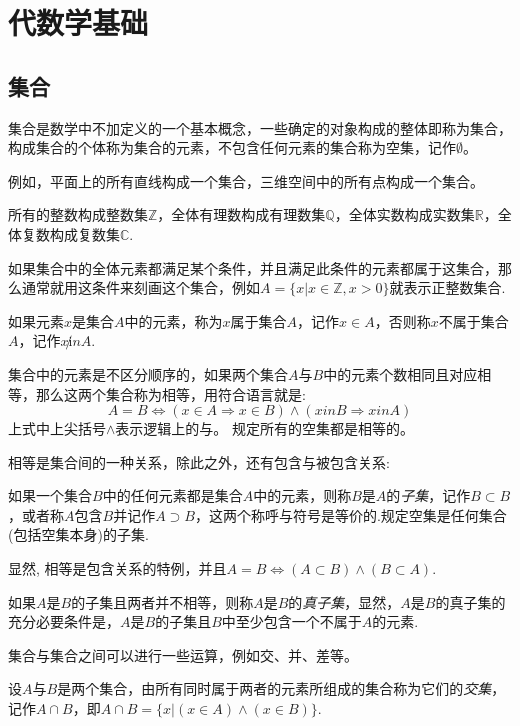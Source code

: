 
\section{代数学基础}
\label{sec:algebra-base}

\subsection{集合}
\label{sec:set}

集合是数学中不加定义的一个基本概念，一些确定的对象构成的整体即称为集合，构成集合的个体称为集合的元素，不包含任何元素的集合称为空集，记作$\emptyset$。

例如，平面上的所有直线构成一个集合，三维空间中的所有点构成一个集合。

所有的整数构成整数集$\mathbb{Z}$，全体有理数构成有理数集$\mathbb{Q}$，全体实数构成实数集$\mathbb{R}$，全体复数构成复数集$\mathbb{C}$.

如果集合中的全体元素都满足某个条件，并且满足此条件的元素都属于这集合，那么通常就用这条件来刻画这个集合，例如$A=\{ x | x \in \mathbb{Z}, x>0 \}$就表示正整数集合.

如果元素$x$是集合$A$中的元素，称为$x$属于集合$A$，记作$x \in A$，否则称$x$不属于集合$A$，记作$x \not in A$.

集合中的元素是不区分顺序的，如果两个集合$A$与$B$中的元素个数相同且对应相等，那么这两个集合称为相等，用符合语言就是:
\[ A = B \Leftrightarrow (x \in A \Rightarrow x \in B) \wedge (x in B \Rightarrow x in A) \]
上式中上尖括号$\wedge$表示逻辑上的与。
 规定所有的空集都是相等的。 

 相等是集合间的一种关系，除此之外，还有包含与被包含关系:
 \begin{definition}
   如果一个集合$B$中的任何元素都是集合$A$中的元素，则称$B$是$A$的\emph{子集}，记作$B \subset B$，或者称$A$包含$B$并记作$A \supset B$，这两个称呼与符号是等价的.规定空集是任何集合(包括空集本身)的子集.
 \end{definition}

 显然, 相等是包含关系的特例，并且$A=B \Leftrightarrow (A \subset B) \wedge (B \subset A)$.

 如果$A$是$B$的子集且两者并不相等，则称$A$是$B$的\emph{真子集}，显然，$A$是$B$的真子集的充分必要条件是，$A$是$B$的子集且$B$中至少包含一个不属于$A$的元素.
 
集合与集合之间可以进行一些运算，例如交、并、差等。
\begin{definition}
  设$A$与$B$是两个集合，由所有同时属于两者的元素所组成的集合称为它们的\emph{交集}，记作$A \cap B$，即$A \cap B = \{ x | (x \in A) \wedge (x \in B) \}$.
\end{definition}

